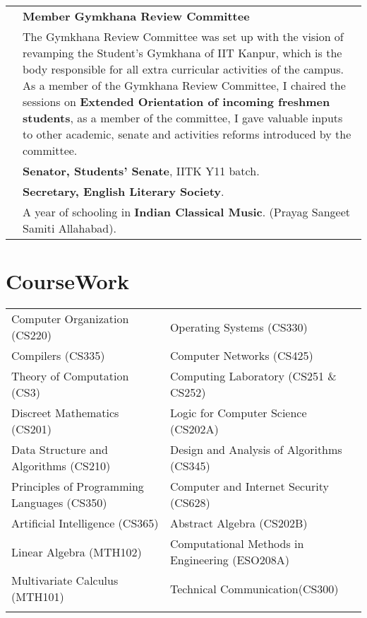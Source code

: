 \documentclass[a4paper,10pt]{article} %
\begin{document}
\begin{tabular}{>{\raggedleft}p{2.2cm}p{14cm}}
    2012 & \textbf{Member Gymkhana Review Committee}\\
         & \footnotesize{The Gymkhana Review Committee was set up with the vision of revamping the Student's Gymkhana
            of IIT Kanpur, which is the body responsible for all extra curricular activities of the campus. As a
            member of the Gymkhana Review Committee, I chaired the sessions on \textbf{Extended Orientation of
            incoming freshmen students}, as a member of the committee, I gave valuable inputs to other academic,
            senate and activities reforms introduced by the committee.}\\

    2012 & \textbf{Senator, Students' Senate}, IITK Y11 batch. \\

    2012 & \textbf{Secretary, English Literary Society}. \\

    2010 & A year of schooling in \textbf{Indian Classical Music}. (Prayag Sangeet Samiti Allahabad). \\

\end{tabular}

\section{CourseWork}

\begin{tabular}{l|l}

    Computer Organization (CS220) & Operating Systems (CS330) \\
    Compilers (CS335) & Computer Networks (CS425) \\
    Theory of Computation (CS3) & Computing Laboratory (CS251 \& CS252)\\
    Discreet Mathematics (CS201) & Logic for Computer Science (CS202A)\\
    Data Structure and Algorithms (CS210) & Design and Analysis of Algorithms (CS345)\\
    Principles of Programming Languages (CS350) & Computer and Internet Security (CS628)\\
    Artificial Intelligence (CS365) & Abstract Algebra (CS202B)\\
    Linear Algebra (MTH102) & Computational Methods in Engineering (ESO208A)\\
    Multivariate Calculus (MTH101) & Technical Communication(CS300)\\
                     \\
\end{tabular}
\end{document}
